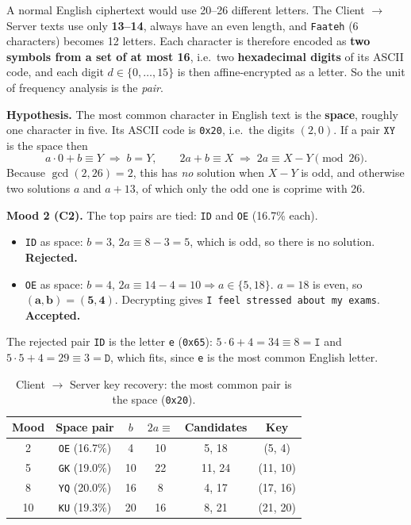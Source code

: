 \documentclass[11pt,a4paper]{article}
\DeclareRobustCommand{\_}{\textunderscore\allowbreak}  %
\newcommand{\ct}[1]{\texttt{#1}}
\newcommand{\csdir}{Client $\rightarrow$ Server}
\begin{document}
A normal English ciphertext would use 20--26 different letters. The \csdir{} texts use only \textbf{13--14}, always have
an even length, and \ct{Faateh} (6 characters) becomes 12 letters. Each character is therefore encoded as \textbf{two
symbols from a set of at most 16}, i.e.\ two \textbf{hexadecimal digits} of its ASCII code, and each digit $d \in
\{0,\ldots,15\}$ is then affine-encrypted as a letter. So the unit of frequency analysis is the \emph{pair}.

\textbf{Hypothesis.} The most common character in English text is the \textbf{space}, roughly one character in five.
Its ASCII code is \ct{0x20}, i.e.\ the digits $(2, 0)$. If a pair $\ct{XY}$ is the space then
\[
a \cdot 0 + b \equiv Y \;\Rightarrow\; b = Y, \qquad 2a + b \equiv X \;\Rightarrow\; 2a \equiv X - Y \pmod{26}.
\]
Because $\gcd(2,26)=2$, this has \emph{no} solution when $X-Y$ is odd, and otherwise two solutions $a$ and $a+13$, of
which only the odd one is coprime with 26.

\textbf{Mood 2 (C2).} The top pairs are tied: \ct{ID} and \ct{OE} (16.7\% each).
\begin{itemize}
\item \ct{ID} as space: $b = 3$, $2a \equiv 8-3 = 5$, which is odd, so there is no solution. \textbf{Rejected.}
\item \ct{OE} as space: $b = 4$, $2a \equiv 14-4 = 10 \Rightarrow a \in \{5, 18\}$. $a = 18$ is even, so
      $\mathbf{(a,b)=(5,4)}$. Decrypting gives \ct{I feel stressed about my exams}. \textbf{Accepted.}
\end{itemize}
The rejected pair \ct{ID} is the letter \ct{e} (\ct{0x65}): $5\cdot6+4 = 34 \equiv 8 = \ct{I}$ and
$5\cdot 5+4 = 29 \equiv 3 = \ct{D}$, which fits, since \ct{e} is the most common English letter.

\begin{table}[H]\centering
\caption{\csdir{} key recovery: the most common pair is the space (\ct{0x20}).}
\begin{tabular}{c c c c c c}
\toprule
Mood & Space pair & $b$ & $2a \equiv$ & Candidates & Key \\
\midrule
2  & \ct{OE} (16.7\%) & 4  & 10 & 5, 18  & (5, 4) \\
5  & \ct{GK} (19.0\%) & 10 & 22 & 11, 24 & (11, 10) \\
8  & \ct{YQ} (20.0\%) & 16 & 8  & 4, 17  & (17, 16) \\
10 & \ct{KU} (19.3\%) & 20 & 16 & 8, 21  & (21, 20) \\
\bottomrule
\end{tabular}
\end{table}
\end{document}
